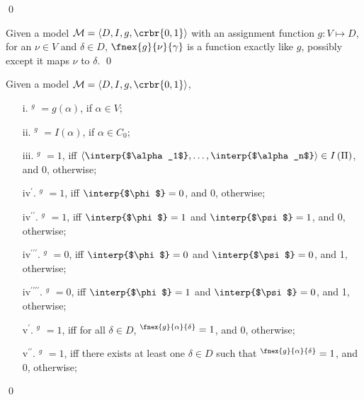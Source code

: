 \documentclass[11pt]{article}
\begin{document}
{\begin{udefinition}[Model]
\qed
\end{udefinition}


\begin{udefinition}
Given a model $\mathcal{M} = \langle D,I,g,\crbr{0,1} \rangle$ with an assignment function $g: V \mapsto D$, for an $\nu \in V$ and $\delta \in D $, $\fnex{g}{\nu}{\gamma}$ is a function exactly like $g$, possibly except it maps $\nu$ to $\delta$.
\qed
\end{udefinition}

\begin{udefinition}
Given a model $\mathcal{M} = \langle D,I,g,\crbr{0,1} \rangle$,

\begin{itemize}
\item[i.]  \interp{$\alpha$}$^g$ $= {g(\alpha)}$, if $\alpha\in V$;
\item[ii.]  \interp{$\alpha$}$^g$ $=  I(\alpha)$, if $\alpha\in C_0$;
\item[iii.] $^g$ $= 1$, iff $\langle\interp{$\alpha_1$},\ldots,\interp{$\alpha_n$}\rangle \in I \left( \Pi \right)$, and  0, otherwise; 
\item[iv$^\prime$.] \interp{$(\neg\phi)$}$^g$ $= 1$, iff $\interp{$\phi$} = 0$, and 0, otherwise;
\item[iv$^{\prime\prime}$.] \interp{$(\phi \land \psi)$}$^g$ $= 1$, iff $\interp{$\phi$} = 1$  and $\interp{$\psi$} = 1$, and 0, otherwise;
\item[iv$^{\prime\prime\prime}$.] \interp{$(\phi \lor \psi)$}$^g$ $= 0$, iff $\interp{$\phi$} = 0$  and $\interp{$\psi$} = 0$, and 1, otherwise;
\item[iv$^{\prime\prime\prime\prime}$.] \interp{$(\phi \cond \psi)$}$^g$ $= 0$, iff $\interp{$\phi$} = 1$  and $\interp{$\psi$} = 0$, and 1, otherwise;
 \item[v$^\prime$.] \interp{$\forall\alpha\phi$}$^g$ $= 1$, iff for all $\delta\in D$, \interp{$\phi$}$^\fnex{g}{\alpha}{\delta} = 1$, and 0, otherwise; 
 \item[v$^{\prime\prime}$.] \interp{$\exists\alpha\phi$}$^g$ $= 1$, iff there exists at least one $\delta\in D$ such that \interp{$\phi$}$^\fnex{g}{\alpha}{\delta} = 1$, and 0, otherwise; 
\end{itemize}

\qed
\end{udefinition}



}
\end{document}
